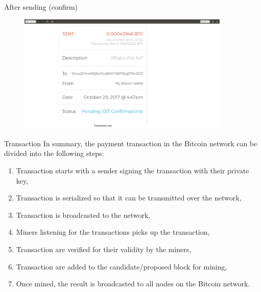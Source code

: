 \documentclass[serif]{beamer}
\begin{document}
	\begin{frame}{After sending (confirm)}
	
		\begin{figure}
			\includegraphics[width=0.9\textwidth]{after}
			\label{fig:result1}
		\end{figure}
		
	\end{frame}
	\begin{frame}{Transaction}
		In summary, the payment transaction in the Bitcoin network can be divided into the following steps:
		\begin{enumerate}[<+->]
			\item Transaction starts with a sender signing the transaction with their private key,
			\item Transaction is serialized so that it can be transmitted over the network,
			\item Transaction is broadcasted to the network,
			\item Miners listening for the transactions picks up the transaction,
			\item Transaction are verified for their validity by the miners,
			\item Transaction are added to the candidate/proposed block for mining,
			\item Once mined, the result is broadcasted to all nodes on the Bitcoin network.																																																								
		\end{enumerate}
	\end{frame}
\end{document}
